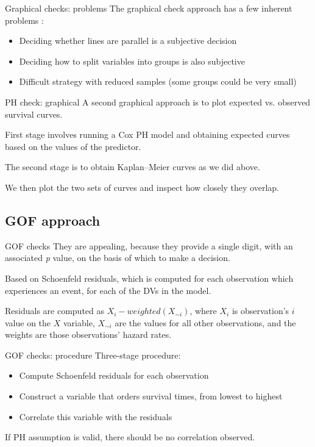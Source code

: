 \documentclass[12pt,english,pdf,xcolor=dvipsnames,aspectratio=169,handout]{beamer}\usepackage[]{graphicx}\usepackage[]{xcolor}
\begin{document}
\begin{frame}[fragile]{Graphical checks: problems}
The graphical check approach has a few inherent problems \cite[pp.~172--174]{Kleinbaum2012}:\bigskip

\begin{itemize}
\item Deciding whether lines are parallel is a subjective decision
\item Deciding how to split variables into groups is also subjective
\item Difficult strategy with reduced samples (some groups could be very small)
\end{itemize}
\end{frame}



\begin{frame}[fragile]{PH check: graphical}
A second graphical approach is to plot expected vs. observed survival curves.\bigskip

First stage involves running a Cox PH model and obtaining expected curves based on the values of the predictor.\bigskip

The second stage is to obtain Kaplan--Meier curves as we did above.\bigskip

We then plot the two sets of curves and inspect how closely they overlap.
\end{frame}



\subsection{GOF approach}
\begin{frame}{GOF checks}
They are appealing, because they provide a single digit, with an associated \textit{p} value, on the basis of which to make a decision.\bigskip

Based on Schoenfeld residuals, which is computed for each observation which experiences an event, for each of the DVs in the model.\bigskip

Residuals are computed as $X_i - weighted(X_{\sim i})$, where $X_i$ is observation's $i$ value on the $X$ variable, $X_{\sim i}$ are the values for all other observations, and the weights are those observations' hazard rates.
\end{frame}



\begin{frame}{GOF checks: procedure}
Three-stage procedure:\bigskip

\begin{itemize}
\item Compute Schoenfeld residuals for each observation
\item Construct a variable that orders survival times, from lowest to highest
\item Correlate this variable with the residuals
\end{itemize}
\bigskip

If PH assumption is valid, there should be no correlation observed.
\end{frame}
\end{document}
